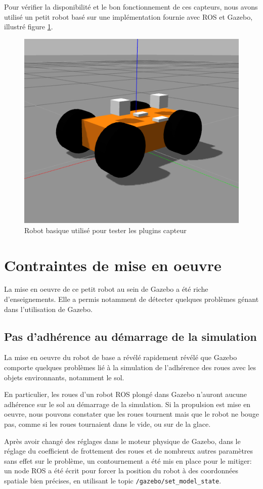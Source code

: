 \documentclass[12pt,a4paper]{report}
\begin{document}
		\para Pour vérifier la disponibilité et le bon fonctionnement de ces capteurs, nous avons utilisé un petit robot basé sur une implémentation fournie avec ROS et Gazebo, illustré figure \ref{fig:petitrobot}. 
		
		\begin{figure}[h!]
			\centering
			\includegraphics[width=0.4\linewidth]{img/image}
			\caption[petitrobot]{Robot basique utilisé pour tester les plugins capteur}
			\label{fig:petitrobot}
		\end{figure}
		
		

		
\section{Contraintes de mise en oeuvre}
	
	\para La mise en oeuvre de ce petit robot au sein de Gazebo a été riche d'enseignements. Elle a permis notamment de détecter quelques problèmes génant dans l'utilisation de Gazebo.
	
		\subsection{Pas d'adhérence au démarrage de la simulation}
		
		La mise en oeuvre du robot de base a révélé rapidement révélé que Gazebo comporte quelques problèmes  lié à la simulation de l'adhérence des roues avec les objets environnants, notamment le sol.
		
		\para En particulier, les roues d'un robot ROS plongé dans Gazebo n'auront aucune adhérence sur le sol au démarrage de la simulation. Si la propulsion est mise en oeuvre, nous pouvons constater que les roues tournent mais que le robot ne bouge pas, comme si les roues tournaient dans le vide, ou sur de la glace.
		
		\para Après avoir changé des réglages dans le moteur physique de Gazebo, dans le réglage du coefficient de frottement des roues et de nombreux autres paramètres sans effet sur le problème, un contournement a été mis en place pour le mitiger: un node ROS a été écrit pour forcer la position du robot à des coordonnées spatiale bien précises, en utilisant le topic \verb|/gazebo/set_model_state|.
		
\end{document}
